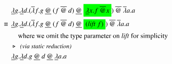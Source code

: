 \documentclass[a4paper,12pt,twoside,openright]{report}
\theoremstyle{definition}
\begin{document}
\begin{figure}[htp!]
    \begin{align}
        & \underline{\lambda}g.\underline{\lambda} d.(\overline{\lambda}f.g \: \underline{@} \: (f \: \overline{@} \: d) \: \underline{@} \: \text{\colorbox{green}{$\underline{\lambda} x.f \: \overline{@} x$}}) \: \overline{@} \: \overline{\lambda} a.a \label{eq:tdpe_ex3a} \\
\equiv\:\: & \underline{\lambda} g.\underline{\lambda} d.(\overline{\lambda}f.g \: \underline{@} \: (f \: \overline{@} \: d) \: \underline{@} \: \text{\colorbox{green}{(\textit{lift} $f$)}}) \: \overline{@} \: \overline{\lambda} a.a \label{eq:tdpe_ex4} \\
        & \quad \text{where we omit the type parameter on \textit{lift} for simplicity} \nonumber \\
        & \triangleright \:\: \emph{\small{\text{(via static reduction)}}} \nonumber \\
        & \underline{\lambda}g.\underline{\lambda} d.g \: \underline{@} \: d \: \underline{@} \: \underline{\lambda} a.a \label{eq:tdpe_ex3b}
    \end{align}
\end{figure}

\end{document}
